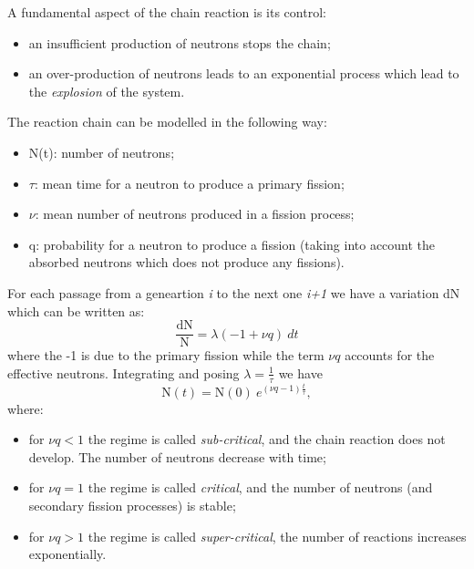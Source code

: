 A fundamental aspect of the chain reaction is its control:
\begin{itemize}
    \item an insufficient production of neutrons stops the chain;
    \item an over-production of neutrons leads to an exponential process which lead to the \emph{explosion} of the system.
\end{itemize}
The reaction chain can be modelled in the following way:
\begin{itemize}
    \item N(t): number of neutrons;
    \item $\tau$: mean time for a neutron to produce a primary fission;
    \item $\nu$: mean number of neutrons produced in a fission process;
    \item q: probability for a neutron to produce a fission (taking into account the absorbed neutrons which does not produce any fissions).
\end{itemize}
For each passage from a geneartion \emph{i} to the next one \emph{i+1} we have a variation dN which can be written as:
\begin{equation}
    \frac{\mbox{dN}}{\mbox{N}} = \lambda (-1 + \nu q)~dt
    \label{eq:nuclear-physics3-eq1}
\end{equation}
where the -1 is due to the primary fission while the term $\nu q$ accounts for the effective neutrons. Integrating and posing $\lambda=\frac{1}{\tau}$ we have
\begin{equation*}
    \mbox{N}(t) = \mbox{N}(0)~ e^{(\nu q -1)\frac{t}{\tau}},
\end{equation*}
where:
\begin{itemize}
    \item for $\nu q < 1$ the regime is called \emph{sub-critical}, and the chain reaction does not develop. The number of neutrons decrease with time;
    \item for $\nu q = 1$ the regime is called \emph{critical}, and the number of neutrons (and secondary fission processes) is stable;
    \item for $\nu q > 1$ the regime is called \emph{super-critical}, the number of reactions increases exponentially.
\end{itemize}

